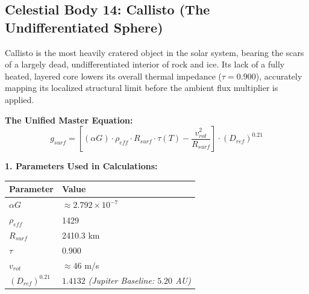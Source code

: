 \documentclass[11pt, a4paper]{article}
\begin{document}
\clearpage
\subsection{Celestial Body 14: Callisto (The Undifferentiated Sphere)}
  Callisto is the most heavily cratered object in the solar system, bearing the scars of a largely dead, undifferentiated interior of rock and ice. Its lack of a fully heated, layered core lowers its overall thermal impedance ($\tau = 0.900$), accurately mapping its localized structural limit before the ambient flux multiplier is applied.

  \vspace{0.5em}
  \noindent \textbf{The Unified Master Equation:}
  $$ g_{surf} = \left[ (\alpha G) \cdot \rho_{eff} \cdot R_{surf} \cdot \tau(T) - \frac{v_{rot}^2}{R_{surf}} \right] \cdot (D_{ref})^{0.21} $$

  \vspace{0.5em}
  \noindent \textbf{1. Parameters Used in Calculations:} \\[0.5em]
  \begingroup
  \renewcommand{\arraystretch}{1.3}
  \hspace*{2em}
  \begin{tabular}{|l|l|}
    \hline
    \textbf{Parameter} & \textbf{Value} \\ \hline
    $\alpha G$ & $\approx 2.792 \times 10^{-7}$ \\ \hline
    $\rho_{eff}$ & 1429 \\ \hline
    $R_{surf}$ & 2410.3 km \\ \hline
    $\tau$ & 0.900 \\ \hline
    $v_{rot}$ & $\approx 46$ m/s \\ \hline
    $(D_{ref})^{0.21}$ & $1.4132$ \textit{(Jupiter Baseline: $5.20$ AU)} \\ \hline
  \end{tabular}
  \endgroup
\end{document}
